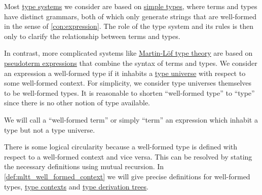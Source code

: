 \begin{remark}\label{rem:well_formed_context}
  Most \hyperref[def:abstract_type_system]{type systems} we consider are based on \hyperref[def:simple_type]{simple types}, where terms and types have distinct grammars, both of which only generate strings that are well-formed in the sense of \cref{con:expression}. The role of the type system and its rules is then only to clarify the relationship between terms and types.

  In contrast, more complicated systems like \hyperref[def:mltt]{Martin-L\"of type theory} are based on \hyperref[con:pseudoterm_expression]{pseudoterm expressions} that combine the syntax of terms and types. We consider an expression a well-formed type if it inhabits a \hyperref[con:type_universe]{type universe} with respect to some well-formed context. For simplicity, we consider type universes themselves to be well-formed types. It is reasonable to shorten \enquote{well-formed type} to \enquote{type} since there is no other notion of type available.

  We will call a \enquote{well-formed term} or simply \enquote{term} an expression which inhabit a type but not a type universe.

  There is some logical circularity because a well-formed type is defined with respect to a well-formed context and vice versa. This can be resolved by stating the necessary definitions using mutual recursion. In \cref{def:mltt_well_formed_context} we will give precise definitions for well-formed types, \hyperref[def:type_context]{type contexts} and \hyperref[def:type_derivation_tree]{type derivation trees}.
\end{remark}

